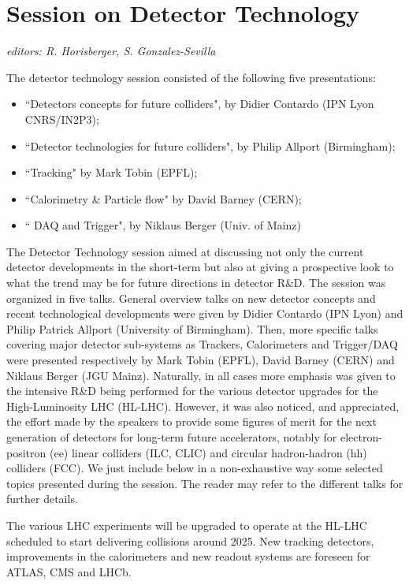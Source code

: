 \section{Session on Detector Technology}\label{detectors}{\it editors: R. Horisberger, S. Gonzalez-Sevilla}

\noindent The detector technology session consisted of the following five  presentations:
\begin{itemize} \setlength{\itemsep}{-1ex}
\item ``Detectors concepts for future colliders",  by  Didier Contardo (IPN Lyon CNRS/IN2P3); 
\item ``Detector technologies for future colliders",  by Philip Allport  (Birmingham); 
\item ``Tracking" by Mark Tobin (EPFL);  
\item ``Calorimetry \& Particle flow" by David Barney (CERN); 
\item `` DAQ and Trigger", by Niklaus Berger (Univ. of Mainz) 
\end{itemize}

\noindent The Detector Technology session aimed at discussing not only the current detector developments in the short-term but also at giving a prospective look to what the trend may be for future directions in detector R\&D. The session was organized in five talks. General overview talks on new detector concepts and recent technological developments were given by Didier Contardo (IPN Lyon) and Philip Patrick Allport (University of Birmingham). Then, more specific talks covering major detector sub-systems as Trackers, Calorimeters and Trigger/DAQ were presented respectively by Mark Tobin (EPFL), David Barney (CERN) and Niklaus Berger (JGU Mainz). Naturally, in all cases more emphasis was given to the intensive R\&D being performed for the various detector upgrades for the High-Luminosity LHC (HL-LHC). However, it was also noticed, and appreciated, the effort made by the speakers to provide some figures of merit for the next generation of detectors for long-term future accelerators, notably for electron-positron (ee) linear colliders (ILC, CLIC) and circular hadron-hadron (hh) colliders (FCC). We just include below in a non-exhaustive way some selected topics presented during the session. The reader may refer to the different talks for further details.
\medskip

\noindent The various LHC experiments will be upgraded to operate at the HL-LHC scheduled to start delivering collisions around 2025. New tracking detectors, improvements in the calorimeters and new readout systems are foreseen for ATLAS, CMS and LHCb. 

